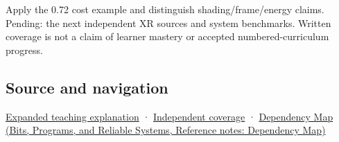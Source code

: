 Apply the 0.72 cost example and distinguish shading/frame/energy claims. Pending: the next independent XR sources and system benchmarks. Written coverage is not a claim of learner mastery or accepted numbered-curriculum progress.

\subsection{Source and navigation}\label{appendix-5878b813b732-source-and-navigation}

\hyperref[04-visual-computing-ii-ch042-foveation-is-allocation-under-uncertain-perception-and-timing]{Expanded teaching explanation} · \hyperref[appendix-fd090d982a15-xr01---independent-seeing-and-representation-source]{Independent coverage} · \href{../01-Bits-Programs-and-Reliable-Systems/main.pdf\#nameddest=appendix-4ad47bdd269a}{Dependency Map (Bits, Programs, and Reliable Systems, Reference notes: Dependency Map)}

